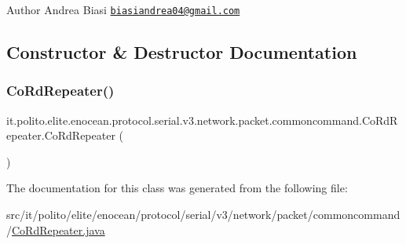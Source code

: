 \begin{DoxyAuthor}{Author}
Andrea Biasi \href{mailto:biasiandrea04@gmail.com}{\tt biasiandrea04@gmail.\+com} 
\end{DoxyAuthor}


\subsection{Constructor \& Destructor Documentation}
\hypertarget{classit_1_1polito_1_1elite_1_1enocean_1_1protocol_1_1serial_1_1v3_1_1network_1_1packet_1_1commoncommand_1_1_co_rd_repeater_a8ff2d8a15faca7687de82b60a8b6dc27}{}\label{classit_1_1polito_1_1elite_1_1enocean_1_1protocol_1_1serial_1_1v3_1_1network_1_1packet_1_1commoncommand_1_1_co_rd_repeater_a8ff2d8a15faca7687de82b60a8b6dc27} 
\subsubsection{\texorpdfstring{Co\+Rd\+Repeater()}{CoRdRepeater()}}
{\footnotesize\ttfamily it.\+polito.\+elite.\+enocean.\+protocol.\+serial.\+v3.\+network.\+packet.\+commoncommand.\+Co\+Rd\+Repeater.\+Co\+Rd\+Repeater (\begin{DoxyParamCaption}{ }\end{DoxyParamCaption})}



The documentation for this class was generated from the following file\+:\begin{DoxyCompactItemize}
\item 
src/it/polito/elite/enocean/protocol/serial/v3/network/packet/commoncommand/\hyperlink{_co_rd_repeater_8java}{Co\+Rd\+Repeater.\+java}\end{DoxyCompactItemize}
